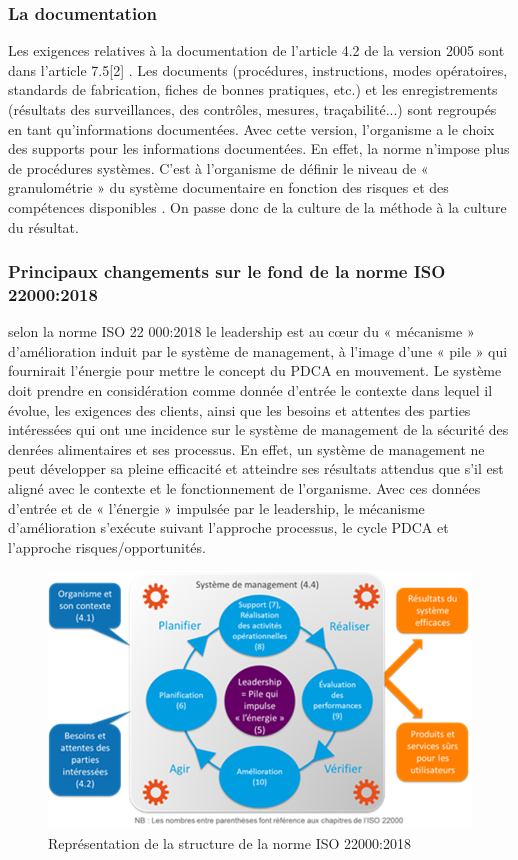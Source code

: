 \begin{spacing}{1.2}
\subsubsection{ La documentation }
Les exigences relatives à la documentation de l’article 4.2 de la version 2005 sont dans l’article 7.5[2] . Les documents (procédures, instructions, modes opératoires, standards de fabrication, fiches de bonnes pratiques, etc.) et les enregistrements (résultats des surveillances, des contrôles, mesures, traçabilité...) sont regroupés en tant qu’informations documentées. Avec cette version, l’organisme a le choix des supports pour les informations documentées. En effet, la norme n’impose plus de procédures systèmes. C’est à l’organisme de définir le niveau de « granulométrie » du système documentaire en fonction des risques et des compétences disponibles . On passe donc de la culture de la méthode à la culture du résultat.
\subsubsection{ Principaux changements sur le fond de la norme ISO 22000:2018 }

selon la norme ISO 22 000:2018  le leadership est au cœur  du  « mécanisme » d’amélioration induit par le système de management, à l’image d’une « pile » qui fournirait l’énergie pour mettre le concept du PDCA en mouvement.
Le système doit prendre en considération comme donnée d’entrée le contexte dans lequel il évolue, les exigences des clients, ainsi que les besoins et attentes des parties intéressées qui ont une incidence sur le système de management de la sécurité des denrées alimentaires et ses processus. En effet, un système de management ne peut développer sa pleine efficacité et atteindre ses résultats attendus que s’il est aligné avec le contexte et le fonctionnement de l’organisme.
Avec ces données d’entrée et de « l’énergie » impulsée par le leadership, le mécanisme d’amélioration s’exécute suivant l’approche processus, le cycle PDCA et l’approche risques/opportunités.


\begin{figure}[!ht]\centering
\includegraphics[scale=0.9]{image4.png}
\caption{ Représentation de la structure de la norme ISO 22000:2018 }
\label{fig:fig1}
\end{figure}


\end{spacing}
